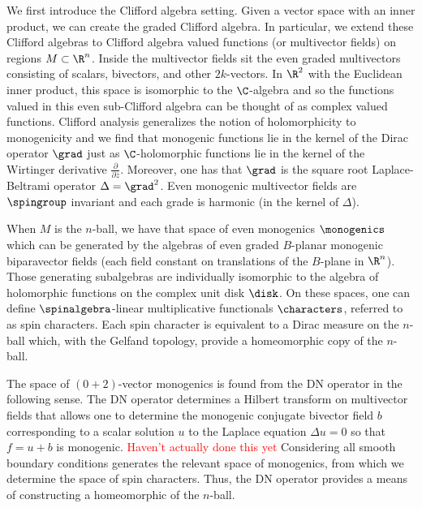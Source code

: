 We first introduce the Clifford algebra setting. Given a vector space with an inner product, we can create the graded Clifford algebra.  In particular, we extend these Clifford algebras to Clifford algebra valued functions (or multivector fields) on regions $M \subset \R^n$.  Inside the multivector fields sit the even graded multivectors consisting of scalars, bivectors, and other $2k$-vectors. In $\R^2$ with the Euclidean inner product, this space is isomorphic to the $\C$-algebra and so the functions valued in this even sub-Clifford algebra can be thought of as complex valued functions.  Clifford analysis generalizes the notion of holomorphicity to monogenicity and we find that monogenic functions lie in the kernel of the Dirac operator $\grad$ just as $\C$-holomorphic functions lie in the kernel of the Wirtinger derivative $\frac{\partial}{\partial \overline{z}}$. Moreover, one has that $\grad$ is the square root Laplace-Beltrami operator $\Delta = \grad^2$. Even monogenic multivector fields are $\spingroup$ invariant and each grade is harmonic (in the kernel of $\Delta$). 

When $M$ is the $n$-ball, we have that space of even monogenics $\monogenics$ which can be generated by the algebras of even graded $B$-planar monogenic biparavector fields (each field constant on translations of the $B$-plane in $\R^n$). Those generating subalgebras are individually isomorphic to the algebra of holomorphic functions on the complex unit disk $\disk$. On these spaces, one can define $\spinalgebra$-linear multiplicative functionals $\characters$, referred to as spin characters. Each spin character is equivalent to a Dirac measure on the $n$-ball which, with the Gelfand topology, provide a homeomorphic copy of the $n$-ball.

The space of $(0+2)$-vector monogenics is found from the DN operator in the following sense.  The DN operator determines a Hilbert transform on multivector fields that allows one to determine the monogenic conjugate bivector field $b$ corresponding to a scalar solution $u$ to the Laplace equation $\Delta u = 0$ so that $f=u+b$ is monogenic. \textcolor{red}{Haven't actually done this yet} Considering all smooth boundary conditions generates the relevant space of monogenics, from which we determine the space of spin characters. Thus, the DN operator provides a means of constructing a homeomorphic of the $n$-ball.
